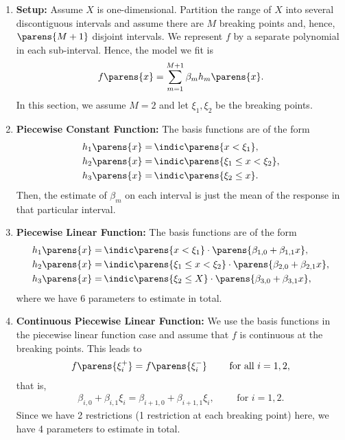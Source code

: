 \documentclass[12pt]{article}
\begin{document}
\begin{enumerate}[label=\textbf{\arabic*.}]
	
	\item \textbf{Setup:} Assume $X$ is one-dimensional. Partition the range of $X$ into several discontiguous intervals and assume there are $M$ breaking points and, hence, $\parens{M+1}$ disjoint intervals. We represent $f$ by a separate polynomial in each sub-interval. Hence, the model we fit is 
	\begin{align*}
		f \parens{x} = \sum_{m=1}^{M+1} \beta_m h_m \parens{x}. 
	\end{align*}
	In this section, we assume $M = 2$ and let $\xi_1, \xi_2$ be the breaking points. 
	
	\item \textbf{Piecewise Constant Function:} The basis functions are of the form 
	\begin{align*}
		h_1 \parens{x} = & \, \indic \parens{x < \xi_1}, \\ 
		h_2 \parens{x} = & \, \indic \parens{ \xi_1 \le x < \xi_2}, \\ 
		h_{3} \parens{x} = & \, \indic \parens{ \xi_{2} \le x}. 
	\end{align*}
	Then, the estimate of $\beta_m$ on each interval is just the mean of the response in that particular interval. 
	
	\item \textbf{Piecewise Linear Function:} The basis functions are of the form 
	\begin{equation*}
		\begin{aligned}
			h_1 \parens{x} = & \, \indic \parens{x < \xi_1} \cdot \parens{\beta_{1,0} + \beta_{1,1} x}, \\ 
			h_2 \parens{x} = & \, \indic \parens{ \xi_1 \le x < \xi_2} \cdot \parens{\beta_{2,0} + \beta_{2,1} x}, \\ 
			h_{3} \parens{x} = & \, \indic \parens{ \xi_{2} \le X} \cdot \parens{\beta_{3,0} + \beta_{3,1} x},
		\end{aligned}
	\end{equation*}
	where we have 6 parameters to estimate in total. 
	
	\item \textbf{Continuous Piecewise Linear Function:} We use the basis functions in the piecewise linear function case and assume that $f$ is continuous at the breaking points. This leads to 
	\begin{align*}
		f \parens{\xi_i^+} = f \parens{\xi_i^-} \qquad \text{ for all } i = 1, 2, 
	\end{align*}
	that is, 
	\begin{align*}
		\beta_{i,0} + \beta_{i,1} \xi_i = \beta_{i+1, 0} + \beta_{i+1, 1} \xi_i, \qquad \text{ for } i = 1, 2. 
	\end{align*}
	Since we have 2 restrictions (1 restriction at each breaking point) here, we have 4 parameters to estimate in total. 
	

\end{enumerate}
\end{document}
